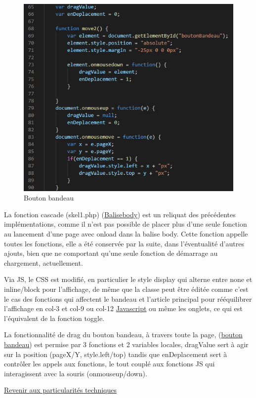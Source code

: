\documentclass[12pt]{report}
\begin{document}
\begin{figure}
\includegraphics[width=0.95\linewidth]{figures/pt-btnbandeau.png}
\caption{Bouton bandeau}
\end{figure}
\par
La fonction cascade (skel1.php) (\hyperlink{fig-balise-body}{Balisebody}) est un reliquat des précédentes implémentations, comme il n’est pas possible de placer plus d’une seule fonction au lancement d’une page avec onload dans la balise body. Cette fonction appelle toutes les fonctions, elle a été conservée par la suite, dans l’éventualité d’autres ajouts, bien que ne comportant qu’une seule fonction de démarrage au chargement, actuellement.
\newline
\bigskip
\par
Via JS, le CSS est modifié, en particulier le style display qui alterne entre none et inline/block pour l’affichage, de même que la classe peut être éditée comme c’est le cas des fonctions qui affectent le bandeau et l’article principal pour rééquilibrer l’affichage en col-3 et col-9 ou col-12 \hyperlink{fig-js}{Javascript} ou même les onglets, ce qui est l’équivalent de la fonction toggle.
\bigskip
\newline
\bigskip
\par
La fonctionnalité de drag du bouton bandeau, à travers toute la page, (\hyperlink{fig-bouton-bandeau}{bouton bandeau}) est permise par 3 fonctions et 2 variables locales, dragValue sert à agir sur la position (pageX/Y, style.left/top) tandis que enDeplacement sert à contrôler les appels aux fonctions, le tout couplé aux fonctions JS qui interagissent avec la souris (onmouseup/down).
\bigskip
\par
\hyperlink{retour-bandeau}{Revenir aux particularités techniques}
\end{document}
